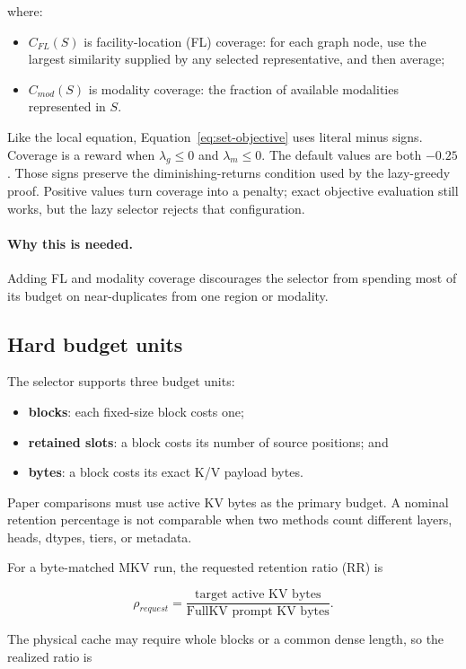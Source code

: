 \documentclass[11pt]{article}
\newcommand{\term}[1]{\textbf{#1}}
\newcommand{\why}{\paragraph{Why this is needed.}}
\begin{document}
where:

\begin{itemize}
  \item $C_{FL}(S)$ is facility-location (FL) coverage: for each graph node, use the largest
        similarity supplied by any selected representative, and then average;
  \item $C_{mod}(S)$ is modality coverage: the fraction of available modalities represented in
        $S$.
\end{itemize}

Like the local equation, Equation~\ref{eq:set-objective} uses literal minus signs. Coverage is a
reward when $\lambda_g\leq0$ and $\lambda_m\leq0$. The default values are both $-0.25$. Those signs
preserve the diminishing-returns condition used by the lazy-greedy proof. Positive values turn
coverage into a penalty; exact objective evaluation still works, but the lazy selector rejects
that configuration.

\why Adding FL and modality coverage discourages the selector from spending most of its budget on
near-duplicates from one region or modality.

\subsection{Hard budget units}

The selector supports three budget units:

\begin{itemize}
  \item \term{blocks}: each fixed-size block costs one;
  \item \term{retained slots}: a block costs its number of source positions; and
  \item \term{bytes}: a block costs its exact K/V payload bytes.
\end{itemize}

Paper comparisons must use active KV bytes as the primary budget. A nominal retention percentage
is not comparable when two methods count different layers, heads, dtypes, tiers, or metadata.

For a byte-matched MKV run, the requested retention ratio (RR) is

\begin{equation}
  \rho_{request}=\frac{\text{target active KV bytes}}
  {\text{FullKV prompt KV bytes}}.
\end{equation}

The physical cache may require whole blocks or a common dense length, so the realized ratio is
\end{document}
